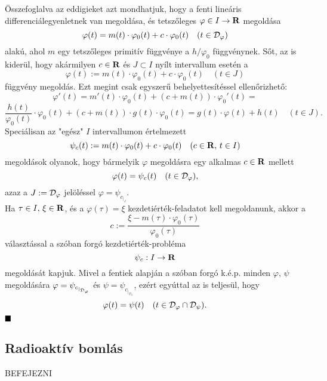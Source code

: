 Összefoglalva az eddigieket azt mondhatjuk, hogy a fenti lineáris differenciálegyenletnek van megoldása, és tetszőleges $\varphi \in I \to \mathbf{R}$ megoldása
\[
\varphi(t) = m(t) \cdot \varphi_0(t) + c \cdot \varphi_0(t) \quad (t \in \mathcal{D}_\varphi)
\]
alakú, ahol $m$ egy tetszőleges primitív függvénye a $h / \varphi_0$ függvénynek. Sőt, az is kiderül, hogy akármilyen $c \in \mathbf{R}$ és $J \subset I$ nyílt intervallum esetén a
\[
\varphi(t) := m(t) \cdot \varphi_0(t) + c \cdot \varphi_0(t) \quad (t \in J)
\]
függvény megoldás. Ezt megint csak egyszerű behelyettesítéssel ellenőrizhető:
\[
\varphi'(t) = m'(t) \cdot \varphi_0(t) + (c + m(t)) \cdot \varphi_0'(t) =
\]
\[
\frac{h(t)}{\varphi_0(t)} \cdot \varphi_0(t) + (c + m(t)) \cdot g(t) \cdot \varphi_0(t) = g(t) \cdot \varphi(t) + h(t) \quad (t \in J).
\]
Speciálisan az "egész" $I$ intervallumon értelmezett
\[
\psi_c(t) := m(t) \cdot \varphi_0(t) + c \cdot \varphi_0(t) \quad (c \in \mathbf{R}, \, t \in I)
\]
megoldások olyanok, hogy bármelyik $\varphi$ megoldásra egy alkalmas $c \in \mathbf{R}$ mellett
\[
\varphi(t) = \psi_c(t) \quad (t \in \mathcal{D}_\varphi),
\]
azaz a $J := \mathcal{D}_\varphi$ jelöléssel $\varphi = \psi_{c_{|_J}}$.\\

Ha $\tau \in I, \, \xi \in \mathbf{R}$, és a $\varphi(\tau) = \xi$ kezdetiérték-feladatot kell megoldanunk, akkor a
\[
c := \frac{\xi - m(\tau) \cdot \varphi_0(\tau)}{\varphi_0(\tau)}
\]
választással a szóban forgó kezdetiérték-probléma
\[
\psi_c : I \to \mathbf{R}
\]
megoldását kapjuk. Mivel a fentiek alapján a szóban forgó k.é.p. minden $\varphi, \, \psi$ megoldására $\varphi = \psi_{c_{|_{\mathcal{D}_\varphi}}}$ és $\psi = \psi_{c_{|_{\mathcal{D}_\psi}}}$, ezért egyúttal az is teljesül, hogy
\[
\varphi(t) = \psi(t) \quad (t \in \mathcal{D}_\varphi \cap \mathcal{D}_\psi).
\]
$\hfill \blacksquare$

\subsection{Radioaktív bomlás}
BEFEJEZNI